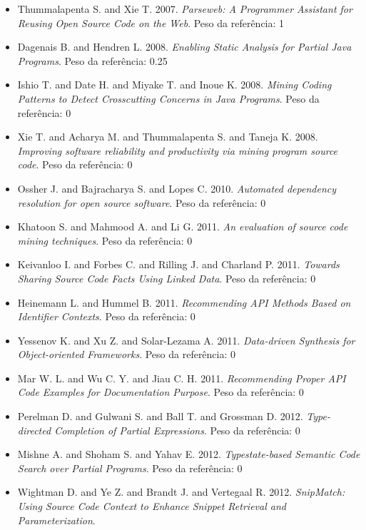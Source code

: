 \begin{itemize}
\item Thummalapenta S. and Xie T.
      2007.
      {\it Parseweb: A Programmer Assistant for Reusing Open Source Code on the Web}.
      Peso da referência: 1
\item Dagenais B. and Hendren L.
      2008.
      {\it Enabling Static Analysis for Partial Java Programs}.
      Peso da referência: 0.25
\item Ishio T. and Date H. and Miyake T. and Inoue K.
      2008.
      {\it Mining Coding Patterns to Detect Crosscutting Concerns in Java Programs}.
      Peso da referência: 0
\item Xie T. and Acharya M. and Thummalapenta S. and Taneja K.
      2008.
      {\it Improving software reliability and productivity via mining program source code}.
      Peso da referência: 0
\item Ossher J. and Bajracharya S. and Lopes C.
      2010.
      {\it Automated dependency resolution for open source software}.
      Peso da referência: 0
\item Khatoon S. and Mahmood A. and Li G.
      2011.
      {\it An evaluation of source code mining techniques}.
      Peso da referência: 0
\item Keivanloo I. and Forbes C. and Rilling J. and Charland P.
      2011.
      {\it Towards Sharing Source Code Facts Using Linked Data}.
      Peso da referência: 0
\item Heinemann L. and Hummel B.
      2011.
      {\it Recommending API Methods Based on Identifier Contexts}.
      Peso da referência: 0
\item Yessenov K. and Xu Z. and Solar-Lezama A.
      2011.
      {\it Data-driven Synthesis for Object-oriented Frameworks}.
      Peso da referência: 0
\item Mar W. L. and Wu C. Y. and Jiau C. H.
      2011.
      {\it Recommending Proper API Code Examples for Documentation Purpose}.
      Peso da referência: 0
\item Perelman D. and Gulwani S. and Ball T. and Grossman D.
      2012.
      {\it Type-directed Completion of Partial Expressions}.
      Peso da referência: 0
\item Mishne A. and Shoham S. and Yahav E.
      2012.
      {\it Typestate-based Semantic Code Search over Partial Programs}.
      Peso da referência: 0
\item Wightman D. and Ye Z. and Brandt J. and Vertegaal R.
      2012.
      {\it SnipMatch: Using Source Code Context to Enhance Snippet Retrieval and Parameterization}.

\end{itemize}
